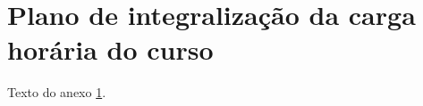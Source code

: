 \chapter[Plano de integraliza{\c c}{\~a}o]{Plano de integraliza{\c c}{\~a}o da carga hor{\'a}ria do curso} 
\label{ape:04} 
%
Texto do anexo \ref{ape:04}.